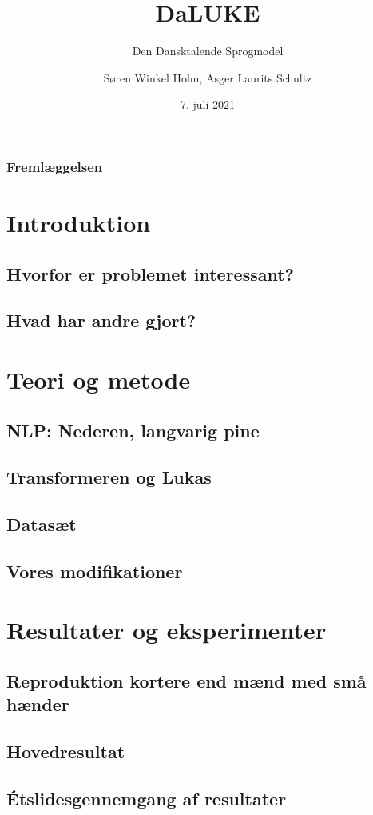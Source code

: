 \documentclass{beamer}
\title{DaLUKE}
\subtitle{
    Den Dansktalende Sprogmodel
}
\author[Søren Holm, Asger Schultz]{Søren Winkel Holm, Asger Laurits Schultz}
\institute[DTU]{Danmarks Tekniske Universitet}
\date{7. juli 2021}
\begin{document}
\begin{frame}
    \titlepage
\end{frame}

\begin{frame}
    \frametitle{Fremlæggelsen}
    \tableofcontents
\end{frame}

\section{Introduktion}
\subsection{Hvorfor er problemet interessant?}
\subsection{Hvad har andre gjort?}

\section{Teori og metode}
\subsection{NLP: Nederen, langvarig pine}
\subsection{Transformeren og Lukas}
\subsection{Datasæt}
\subsection{Vores modifikationer}

\section{Resultater og eksperimenter}
\subsection{Reproduktion kortere end mænd med små hænder}
\subsection{Hovedresultat}
\subsection{Étslidesgennemgang af resultater}
\end{document}
